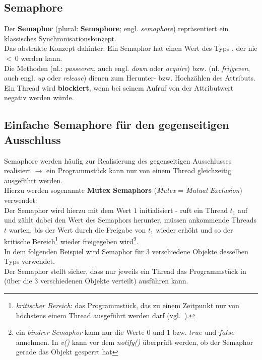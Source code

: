 \subsection{Semaphore}

Der \textbf{Semaphor} (plural: \textbf{Semaphore}; engl. \textit{semaphore}) repräsentiert ein klassisches Synchronisationskonzept.\\

\noindent
Das abstrakte Konzept dahinter: Ein Semaphor hat einen Wert des Typs , der nie $<\ 0$ werden kann.\\
Die Methoden  (nl.: \textit{passeeren}, auch engl. \textit{down} oder \textit{acquire}) bzw.  (nl. \textit{frijgeven}, auch engl. \textit{up} oder \textit{release}) dienen zum Herunter- bzw. Hochzählen des Attributs.\\

\noindent
Ein Thread wird \textbf{blockiert}, wenn bei seinem Aufruf von  der Attributwert negativ werden würde.

\subsection{Einfache Semaphore für den gegenseitigen Ausschluss}

Semaphore werden häufig zur Realisierung des gegenseitigen Ausschlusses realisiert $\rightarrow$ ein Programmstück kann nur von einem Thread gleichzeitig ausgeführt werden.\\

\noindent
Hierzu werden sogenannte \textbf{Mutex Semaphors} (\textit{Mutex} = \textit{Mutual Exclusion}) verwendet:\\
Der Semaphor wird hierzu mit dem Wert $1$ initialisiert - ruft ein Thread $t_1$  auf und zählt dabei den Wert des Semaphors herunter, müssen ankommende Threads $t$ warten, bis der Wert durch die Freigabe von $t_1$ wieder erhöht und so der kritische Bereich\footnote{
    \textit{kritischer Bereich}: das Programmstück, das zu einem Zeitpunkt nur von höchstens einem Thread ausgeführt werden darf (vgl.~\cite[102]{Oec22}).
} wieder freigegeben wird\footnote{ein \textit{binärer Semaphor} kann nur die Werte $0$ und $1$ bzw. $true$ und $false$ annehmen. In \textit{v()} kann vor dem \textit{notify()} überprüft werden, ob der Semaphor gerade das Objekt gesperrt hat}.\\

\noindent
In dem folgenden Beispiel wird  Semaphor für 3 verschiedene Objekte desselben Typs verwendet.\\
Der Semaphor stellt sicher, dass nur jeweils ein Thread das Programmstück in  (über die $3$ verschiedenen Objekte verteilt) ausführen kann. \\

